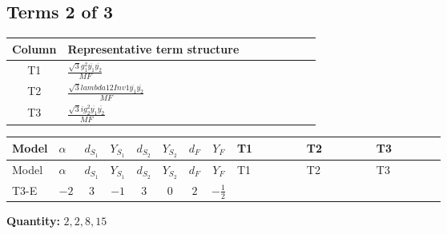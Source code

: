 \documentclass[8pt]{article}
\begin{document}
\begin{landscape}
\subsection*{Terms 2 of 3}
\begin{center}
\begin{tabular}{@{}c >{\raggedright\arraybackslash}p{0.82\linewidth}@{}}
\toprule
Column & Representative term structure \\
\midrule
T1 & \(\displaystyle \frac{\sqrt{3} g_{1}^{2} \overline{y_{1}} \overline{y_{2}}}{MF}\) \\
\midrule
T2 & \(\displaystyle \frac{\sqrt{3} lambda12Inv1 \overline{y_{1}} \overline{y_{2}}}{MF}\) \\
\midrule
T3 & \(\displaystyle \frac{\sqrt{3} i g_{2}^{2} \overline{y_{1}} \overline{y_{2}}}{MF}\) \\
\midrule
\bottomrule
\end{tabular}
\end{center}
\smallskip
\tiny
\begin{longtable}{@{}llcccccc >{\raggedright\arraybackslash}p{0.21\linewidth} >{\raggedright\arraybackslash}p{0.21\linewidth} >{\raggedright\arraybackslash}p{0.21\linewidth}@{}}
\toprule
Model & $\alpha$ & $d_{S_1}$ & $Y_{S_1}$ & $d_{S_2}$ & $Y_{S_2}$ & $d_F$ & $Y_F$ & T1 & T2 & T3 \\
\midrule
\endfirsthead
\toprule
Model & $\alpha$ & $d_{S_1}$ & $Y_{S_1}$ & $d_{S_2}$ & $Y_{S_2}$ & $d_F$ & $Y_F$ & T1 & T2 & T3 \\
\midrule
\endhead
T3-E & $-2$ & $3$ & $-1$ & $3$ & $0$ & $2$ & $-\frac{1}{2}$ & \scriptsize\adjustbox{max width=\linewidth}{$\begin{gathered} - \frac{\sqrt{3} g_{1}^{2} \overline{y_{1}} \overline{y_{2}}}{8 MF}\end{gathered}$} & \scriptsize\adjustbox{max width=\linewidth}{$\begin{gathered} \frac{\sqrt{3} lambda12Inv1 \overline{y_{1}} \overline{y_{2}}}{6 MF}\end{gathered}$} & \scriptsize\adjustbox{max width=\linewidth}{$\begin{gathered} - \frac{\sqrt{3} i g_{2}^{2} \overline{y_{1}} \overline{y_{2}}}{6 MF}\end{gathered}$} \\
\midrule
\bottomrule
\end{longtable}
\clearpage
\noindent\textbf{Quantity: }$\mathrm{2,2,8,15}$\par\smallskip

\end{landscape}
\end{document}
